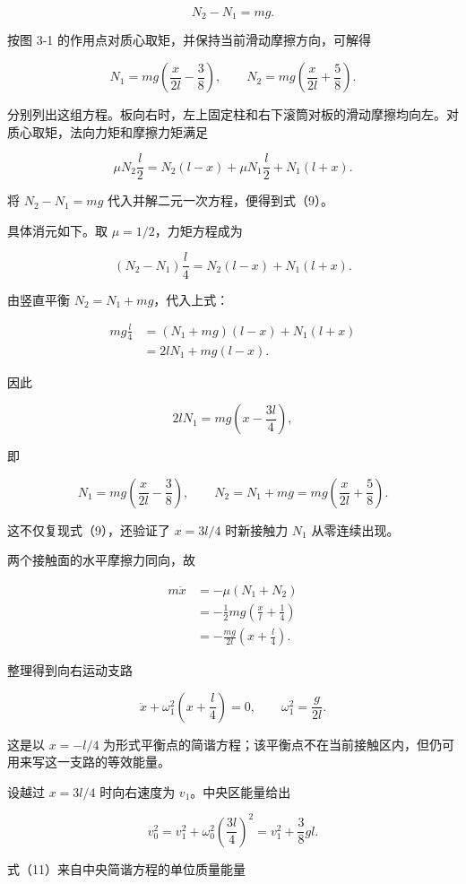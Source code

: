 \documentclass[12pt,a4paper,UTF8]{ctexart}
\begin{document}
\[
N_2-N_1=mg.
\tag{8}
\]

按图 3-1 的作用点对质心取矩，并保持当前滑动摩擦方向，可解得

\[
N_1=mg\left(\frac{x}{2l}-\frac38\right),
\qquad
N_2=mg\left(\frac{x}{2l}+\frac58\right).
\tag{9}
\]

分别列出这组方程。板向右时，左上固定柱和右下滚筒对板的滑动摩擦均向左。对质心取矩，法向力矩和摩擦力矩满足

\[
\mu N_2\frac l2
=N_2(l-x)+\mu N_1\frac l2+N_1(l+x).
\]

将 \(N_2-N_1=mg\) 代入并解二元一次方程，便得到式（9）。

具体消元如下。取 \(\mu=1/2\)，力矩方程成为

\[
(N_2-N_1)\frac l4
=N_2(l-x)+N_1(l+x).
\]

由竖直平衡 \(N_2=N_1+mg\)，代入上式：

\[
\begin{aligned}
mg\frac l4
&=(N_1+mg)(l-x)+N_1(l+x)\\
&=2lN_1+mg(l-x).
\end{aligned}
\]

因此

\[
2lN_1=mg\left(x-\frac{3l}{4}\right),
\]

即

\[
N_1=mg\left(\frac{x}{2l}-\frac38\right),
\qquad
N_2=N_1+mg
=mg\left(\frac{x}{2l}+\frac58\right).
\]

这不仅复现式（9），还验证了 \(x=3l/4\) 时新接触力 \(N_1\) 从零连续出现。

两个接触面的水平摩擦力同向，故

\[
\begin{aligned}
m\ddot x
&=-\mu(N_1+N_2)\\
&=-\frac12mg\left(\frac xl+\frac14\right)\\
&=-\frac{mg}{2l}\left(x+\frac l4\right).
\end{aligned}
\]

整理得到向右运动支路

\[
\ddot x+\omega_1^2\left(x+\frac l4\right)=0,
\qquad
\omega_1^2=\frac g{2l}.
\tag{10}
\]

这是以 \(x=-l/4\)
为形式平衡点的简谐方程；该平衡点不在当前接触区内，但仍可用来写这一支路的等效能量。

设越过 \(x=3l/4\) 时向右速度为 \(v_1\)。中央区能量给出

\[
v_0^2=v_1^2+\omega_0^2\left(\frac{3l}{4}\right)^2
=v_1^2+\frac38gl.
\tag{11}
\]

式（11）来自中央简谐方程的单位质量能量
\end{document}
